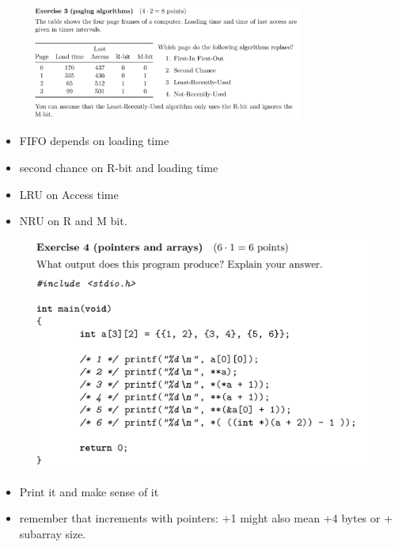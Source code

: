 \documentclass[10pt]{beamer}
\begin{document}
\begin{frame}{}
         
        \framebreak
        
         \begin{figure}
          \includegraphics[keepaspectratio, width=0.8\textwidth, height=0.8\textheight-2\baselineskip-2\baselineskip]{img/ex6_102.png} \\
        \end{figure}
        \begin{itemize}
         \item FIFO depends on loading time
         \item second chance on R-bit and loading time
         \item LRU on Access time
         \item NRU on R and M bit.
        \end{itemize}
        \framebreak 
        
         \begin{figure}
          \includegraphics[keepaspectratio, width=\textwidth, height=\textheight]{img/ex6_103.png} \\
        \end{figure}
        \framebreak
        \begin{itemize}
        \item Print it and make sense of it
        \item remember that increments with pointers: +1 might also mean +4 bytes or + subarray size.
        \end{itemize}
        \framebreak 
        

\end{frame}
\end{document}
